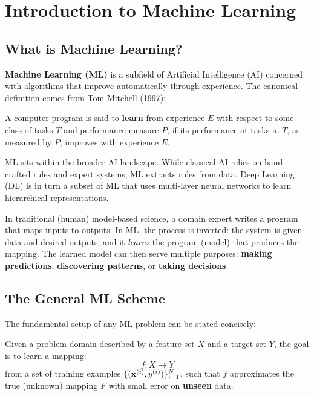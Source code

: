 \chapter*{Introduction to Machine Learning}

\section*{What is Machine Learning?}

\textbf{Machine Learning (ML)} is a subfield of Artificial Intelligence (AI) concerned with algorithms that improve automatically through experience. The canonical definition comes from Tom Mitchell (1997):

\begin{definition}
A computer program is said to \textbf{learn} from experience $E$ with respect to some class of tasks $T$ and performance measure $P$, if its performance at tasks in $T$, as measured by $P$, improves with experience $E$.
\end{definition}

\begin{remark}[ML $\subseteq$ AI]
ML sits within the broader AI landscape. While classical AI relies on hand-crafted rules and expert systems, ML extracts rules from data. Deep Learning (DL) is in turn a subset of ML that uses multi-layer neural networks to learn hierarchical representations.
\end{remark}

In traditional (human) model-based science, a domain expert writes a program that maps inputs to outputs. In ML, the process is inverted: the system is given data and desired outputs, and it \textit{learns} the program (model) that produces the mapping. The learned model can then serve multiple purposes: \textbf{making predictions}, \textbf{discovering patterns}, or \textbf{taking decisions}.

\section*{The General ML Scheme}

The fundamental setup of any ML problem can be stated concisely:

\begin{definition}
Given a problem domain described by a feature set $X$ and a target set $Y$, the goal is to learn a mapping:
$$f: X \to Y$$
from a set of training examples $\{(\mathbf{x}^{(i)}, y^{(i)})\}_{i=1}^{N}$, such that $f$ approximates the true (unknown) mapping $F$ with small error on \textbf{unseen} data.
\end{definition}

